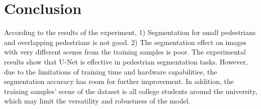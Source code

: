 \documentclass[12pt, a4paper]{article}
\begin{document}
	\section{Conclusion} \justify
	According to the results of the experiment, 1) Segmentation for small pedestrians and overlapping pedestrians is not good. 2) The segmentation effect on images with very different scenes from the training samples is poor. The experimental results show that U-Net is effective in pedestrian segmentation tasks. However, due to the limitations of training time and hardware capabilities, the segmentation accuracy has room for further improvement. In addition, the training samples' scene of the dataset is all college students around the university, which may limit the versatility and robustness of the model.

	\newpage
	
	  
	

\end{document}
